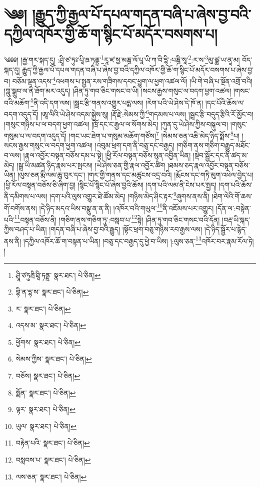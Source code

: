 \setcounter{footnote}{0} 
\chapter{༄༅། །རྒྱུད་ཀྱི་རྒྱལ་པོ་དཔལ་གདན་བཞི་པ་ཞེས་བྱ་བའི་དཀྱིལ་འཁོར་གྱི་ཆོ་ག་སྙིང་པོ་མདོར་བསགས་པ།}༄༅༅། །རྒྱ་གར་སྐད་དུ། :ཤྲཱི་ཙ་ཏུཿ་པཱི་ཋ་ཏནྟྲ་\footnote{ཤྲཱི་ཙཏུརྦི་ཐཱི་ཏནྡྲ་  སྣར་ཐང་།  པེ་ཅིན། }རཱ་ཛ་སྱ་མཎྜ་ལོ་པཱ་ཡི་ཀ་བི་དྷི་:པཎྜི་སཱ་\footnote{བྷི་ན་དྷ་ས་  སྣར་ཐང་།  པེ་ཅིན། }:ར་ས་\footnote{ར་  སྣར་ཐང་།  པེ་ཅིན། }མུ་ཙྪ་ཡ་ནཱ་མ། བོད་སྐད་དུ། རྒྱུད་ཀྱི་རྒྱལ་པོ་དཔལ་གདན་བཞི་པ་ཞེས་བྱ་བའི་དཀྱིལ་འཁོར་གྱི་ཆོ་ག་སྙིང་པོ་མདོར་བསགས་པ་ཞེས་བྱ་བ། བཅོམ་ལྡན་འདས་\footnote{འདས་མ་  སྣར་ཐང་།  པེ་ཅིན། }འཕགས་པ་སྤྱན་རས་གཟིགས་དབང་ཕྱུག་ལ་ཕྱག་འཚལ་ལོ། །ཡི་གེ་བཞི་པ་སྔོན་འགྲོ་བའི། །ཀླུ་སྒྲུབ་ལ་ནི་ཐོག་མར་འདུད། །ཤིན་ཏུ་གབ་ཅིང་གསང་བ་ཡི། །སངས་རྒྱས་གསུང་ལ་བདག་ཕྱག་འཚལ། །གསང་བའི་མཆོག་\footnote{ཕྱོགས་  སྣར་ཐང་།  པེ་ཅིན། }ནི་འདི་དག་ལས། །སྦྲང་རྩི་གནས་འགྱུར་པདྨ་ལས། །རེག་པའི་ཡེ་ཤེས་དེ་ཁོ་ན། །དང་པོའི་ཆོས་ལ་བདག་འདུད་དོ། །ཨཱ་ལིའི་ཡེ་ཤེས་འདམ་སྐྱེས་སུ། །རྡོ་རྗེ་:སེམས་ཀྱི་\footnote{སེམས་ཀྱིས་  སྣར་ཐང་།  པེ་ཅིན། }གདམས་པ་ལས། །སྦྲང་རྩི་བདུད་རྩིའི་རོ་མྱོང་བ། །གསུང་གཉིས་པ་ལ་བདག་ཕྱག་འཚལ། །ཁྲོ་དང་ང་རྒྱལ་ལ་སོགས་མེད། །ཀུན་དུ་ཡེ་ཤེས་ཀྱིས་བསྐུལ་བ། །གསུང་གསུམ་པ་ལ་བདག་འདུད་དོ། །གང་ཡང་ཐེག་པ་གསུམ་མཆོག་གཙོས།\footnote{བཅོས།  སྣར་ཐང་།  པེ་ཅིན། } །སེམས་ཅན་འཆི་མེད་ཉིད་སྨོས་\footnote{སྨོན་  སྣར་ཐང་།  པེ་ཅིན། }པ། །སངས་རྒྱས་གསུང་ལ་བདག་ཕྱག་འཚལ། །འབུམ་ཕྲག་དག་ནི་བཅུ་དང་བརྒྱད། །གཅིག་ནས་གཅིག་བརྒྱུད་མཐོང་བ་ལས། །རྣལ་འབྱོར་བསྟན་བཅོས་དམ་པ་སྟེ། །ཕྱི་རོལ་བསྟན་བཅོས་སུན་འབྱིན་ཡིན། །སྡེབ་སྦྱོར་དང་ནི་ཚད་མ་མེད། །སྒྲ་ཡི་མཚན་ཉིད་རྣམ་པར་སྤངས། །ཡེ་ཤེས་ཅན་གྱི་རྣལ་འབྱོར་ཚིག །ཐམས་ཅད་རྣལ་འབྱོར་བསྟན་བཅོས་ཡིན། །ལུས་ཅན་རྨི་ལམ་ཆུ་བུར་དང་། །གར་གྱི་གནས་དང་མཚུངས་འདྲ་བའི། །རྨོངས་དང་གཏི་མུག་འཕེལ་བྱེད་པ། །ཕྱི་རོལ་བསྟན་བཅོས་ཅི་ཞིག་བྱ། །སྙིང་པོ་སྙིང་པོ་ཞེས་བྱའི་ཆོས། །དག་པའི་ལམ་ནི་ངེས་པར་སྤྱད། །དག་པའི་ཆོས་ནི་དམིགས་པ་ལས། །དག་པའི་ལུས་འགྱུར་ཐེ་ཚོམ་མེད། །གཉིས་མེད་ཤིང་རྟར་\footnote{ལྟར་  སྣར་ཐང་།  པེ་ཅིན། }ཞུགས་ནས་ནི། །ཐེག་ལེའི་གོ་ཆས་གོ་བགོས་ནས། །དེ་ཉིད་མདའ་ཡིས་བསྣུ་ན་ན་ནི། །འཁོར་བའི་གཡུལ་\footnote{ཡུལ་  སྣར་ཐང་།  པེ་ཅིན། }ནི་འཇོམས་པར་འགྱུར། །དོན་ལ་:བསྟེན་པའི་\footnote{བརྟེན་པའི་  སྣར་ཐང་།  པེ་ཅིན། }བསྟན་བཅོས་ནི། །གཅིག་ནས་གཅིག་ཏུ་:བསླབ་པ་\footnote{བསླབས་པ་  སྣར་ཐང་།  པེ་ཅིན། }སྟེ། །ཤིན་ཏུ་གབ་ཅིང་གསང་བའི་དོན། །བརྡ་ཡི་སྐད་ཀྱིས་བཤད་པ་ཡིན། །གདན་བཞི་པ་ཞེས་བྱ་བའི་རྒྱུད། །སྟོང་ཕྲག་བཅུ་གཉིས་རབ་རྒྱས་ལས། །དེ་ཉིད་སྦྱོར་པ་རྙེད་ནས་ནི། །དཀྱིལ་འཁོར་ཆོ་ག་བསྟན་པ་ཡིན། །བཅུ་དང་བརྒྱད་དུ་ཕྱེ་བ་ཡིས། །:ལུས་ཅན་\footnote{ལས་ཅན་  སྣར་ཐང་།  པེ་ཅིན། }འཁོར་བར་རྣམ་རོལ་ཏེ། །
